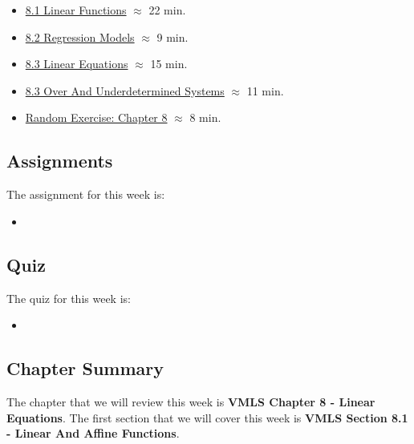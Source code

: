 \begin{itemize}
    \item \href{https://applied.cs.colorado.edu/mod/hvp/view.php?id=50757}{8.1 Linear Functions} $\approx$ 22 min.
    \item \href{https://applied.cs.colorado.edu/mod/hvp/view.php?id=50758}{8.2 Regression Models} $\approx$ 9 min.
    \item \href{https://applied.cs.colorado.edu/mod/hvp/view.php?id=50759}{8.3 Linear Equations} $\approx$ 15 min.
    \item \href{https://applied.cs.colorado.edu/mod/hvp/view.php?id=50760}{8.3 Over And Underdetermined Systems} $\approx$ 11 min.
    \item \href{https://applied.cs.colorado.edu/mod/hvp/view.php?id=50761}{Random Exercise: Chapter 8} $\approx$ 8 min.
\end{itemize}

\subsection{Assignments}

The assignment for this week is:

\begin{itemize}
    \item {}
\end{itemize}

\subsection{Quiz}

The quiz for this week is:

\begin{itemize}
    \item {}
\end{itemize}

\newpage

\subsection{Chapter Summary}

The chapter that we will review this week is \textbf{VMLS Chapter 8 - Linear Equations}. The first section that we will cover this week is \textbf{VMLS Section 8.1 - Linear And Affine Functions}.

